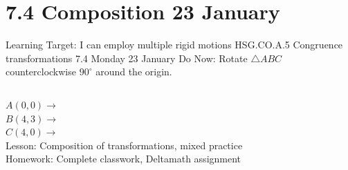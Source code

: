 \section{7.4 Composition \hfill 23 January \,}
\begin{frame}{Learning Target: I can employ multiple rigid motions}
  {HSG.CO.A.5 Congruence transformations \hfill \alert{7.4 Monday 23 January}}
  Do Now: Rotate $\triangle ABC$ counterclockwise $90^\circ$ around the origin.  \vspace{0.5cm}
  \begin{columns}
    $A(0,0) \rightarrow$ \\[0.3cm]
    $B(4,3) \rightarrow$ \\[0.3cm]
    $C(4,0) \rightarrow$ \\[0.3cm]
    Lesson: Composition of transformations, mixed practice \\[0.5cm]
    Homework: Complete classwork, Deltamath assignment
    \begin{flushright}
    \end{flushright}
  \end{columns}
\end{frame}

